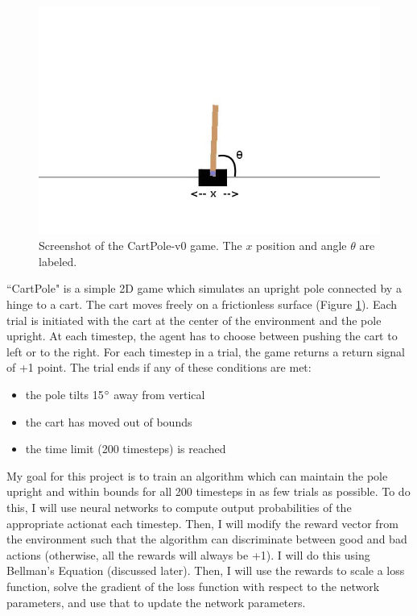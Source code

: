 \documentclass[12pt,a4paper]{article}
\begin{document}
\begin{figure}[htbp]
\begin{center}
\includegraphics[scale=0.66]{cartpole.jpg}
\caption{Screenshot of the CartPole-v0 game. The $x$ position and angle $\theta$ are labeled.}
\label{cartpole}
\end{center}
\end{figure}

``CartPole" is a simple 2D game which simulates an upright pole connected by a hinge to a cart.\cite{cartpole} The cart moves freely on a frictionless surface (Figure \ref{cartpole}). Each trial is initiated with the cart at the center of the environment and the pole upright. At each timestep, the agent has to choose between pushing the cart to left or to the right.  For each timestep in a trial, the game returns a return signal of +1 point. The trial ends if any of these conditions are met:




\begin{itemize}
 \item  the pole tilts 15$\degree$ away from vertical
 \item the cart has moved out of bounds
 \item the time limit (200 timesteps) is reached
 \end{itemize}
 
My goal for this project is to train an algorithm which can maintain the pole upright and within bounds for all 200 timesteps in as few trials as possible. To do this, I will use neural networks to compute output probabilities of the appropriate actionat each timestep. Then, I will modify the reward vector from the environment such that the algorithm can discriminate between good and bad actions (otherwise, all the rewards will always be +1). I will do this using Bellman's Equation (discussed later). Then, I will use the rewards to scale a loss function, solve the gradient of the loss function with respect to the network parameters, and use that to update the network parameters. 
\end{document}
